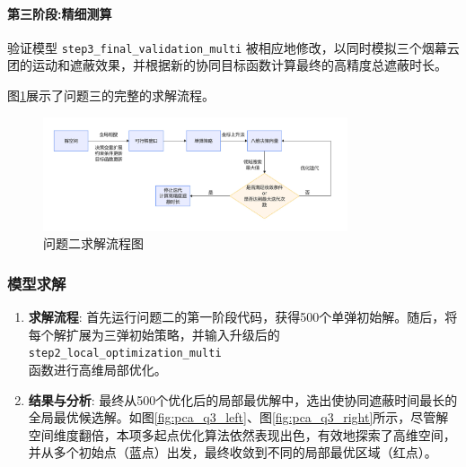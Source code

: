 \documentclass[12pt]{article}
\newcommand{\code}[1]{\texttt{#1}} %
\begin{document}
\begin{CJK}{UTF8}{gbsn}
		\paragraph{第三阶段:精细测算} 验证模型 \code{step3\_final\_validation\_multi} 被相应地修改，以同时模拟三个烟幕云团的运动和遮蔽效果，并根据新的协同目标函数计算最终的高精度总遮蔽时长。
		
		图\ref{fig:flowchart_q3}展示了问题三的完整的求解流程。
		
		
		\begin{figure}[H]
			\centering
			\includegraphics[width=0.8\textwidth]{pic/Fg7-Pb3.jpg}
			\caption{问题二求解流程图}
			\label{fig:flowchart_q3}
		\end{figure}
		
		\subsubsection{模型求解}
		\begin{enumerate}
			\item \textbf{求解流程}: 首先运行问题二的第一阶段代码，获得500个单弹初始解。随后，将每个解扩展为三弹初始策略，并输入升级后的\code{step2\_local\_optimization\_multi}\\函数进行高维局部优化。
			
			\item \textbf{结果与分析}: 最终从500个优化后的局部最优解中，选出使协同遮蔽时间最长的全局最优候选解。如图\ref{fig:pca_q3_left}、图\ref{fig:pca_q3_right}所示，尽管解空间维度翻倍，本项多起点优化算法依然表现出色，有效地探索了高维空间，并从多个初始点（蓝点）出发，最终收敛到不同的局部最优区域（红点）。
			

\end{enumerate}
\end{CJK}
\end{document}
